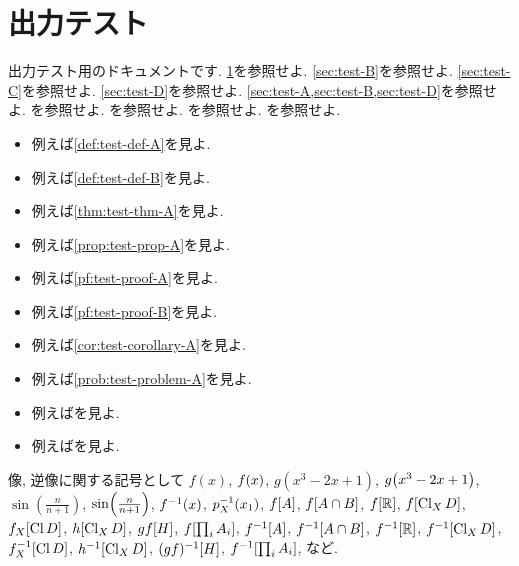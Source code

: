 \documentclass[uplatex, dvipdfmx, a4paper, 12pt, class=jsbook, crop=false]{standalone}
\begin{document}
\section{出力テスト}
\label{sec:test-A}

出力テスト用のドキュメントです.
\cref{sec:test-A}を参照せよ.
\cref{sec:test-B}を参照せよ.
\cref{sec:test-C}を参照せよ\WIP.
\cref{sec:test-D}を参照せよ.
\cref{sec:test-A,sec:test-B,sec:test-D}を参照せよ. %
\cite[Theorem~5.6.1]{Engelking1995TD}を参照せよ.
\cite[Theorem~5.6.1, Theorem~5.8.3, Proposition~5.9.10]{Engelking1995TD}を参照せよ.
\cite[132--134]{Morita1981ja}を参照せよ. %
\cite{KodamaNagami1974ja}を参照せよ.

\begin{itemize}
	\item 例えば\cref{def:test-def-A}を見よ.
	\item 例えば\cref{def:test-def-B}を見よ.
	\item 例えば\cref{thm:test-thm-A}を見よ.
	\item 例えば\cref{prop:test-prop-A}を見よ.
	\item 例えば\cref{pf:test-proof-A}を見よ\WIP.
	\item 例えば\cref{pf:test-proof-B}を見よ.
	\item 例えば\cref{cor:test-corollary-A}を見よ.
	\item 例えば\cref{prob:test-problem-A}を見よ.
	\item 例えば\cite{KodamaNagami1974ja}を見よ.
	\item 例えば\cite{Morita1981ja}を見よ.
\end{itemize}

像, 逆像に関する記号として
$f(x)$,
$\mappt{f}{x}$,
$g(x^3 - 2x + 1)$,
$\mappt{g}{x^3 - 2x + 1}$,
$\sin(\frac{n}{n+1})$,
$\mappt{\sin}{\frac{n}{n+1}}$,
$\mapinvpt{f}{x}$,
$\mapinvpt{p_X}{x_1}$,
$\mapset{f}{A}$,
$\mapset{f}{A \cap B}$,
$\mapset{f}{\R}$,
$\mapset{f}{\topcl_X D}$,
$\mapset{f_X}{\topcl D}$,
$\mapset{h}{\topcl_X D}$,
$\mapset{gf}{H}$,
$\mapset{f}{\prod_i A_i}$,
$\mapinvset{f}{A}$,
$\mapinvset{f}{A \cap B}$,
$\mapinvset{f}{\R}$,
$\mapinvset{f}{\topcl_X D}$,
$\mapinvset{f_X}{\topcl D}$,
$\mapinvset{h}{\topcl_X D}$,
$\mapinvset{(gf)}{H}$,
$\mapinvset{f}{\prod_i A_i}$,
など.

\begin{definition}
	\label{def:test-def-A}
	\lipsum[1][1-4]
	\lipsum[11][1-4]
\end{definition}
\end{document}
